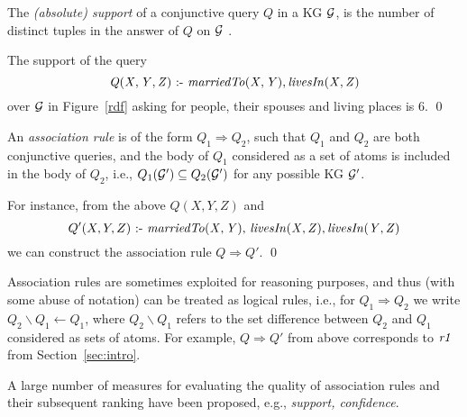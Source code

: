 The \emph{(absolute) support} of a conjunctive query $Q$ in a KG $\mathcal{G}$, is the number of distinct tuples in the answer of $Q$ on $\mathcal{G}$ \cite{DBLP:conf/ilp/DehaspeR97}. 

\begin{example}
The support of the query
\begin{equation}\mathit{Q(X,Y,Z)\text{ :- }marriedTo(X,Y),\, }\mathit{livesIn(X,Z)}
\end{equation}
over $\mathcal{G}$ in Figure~\ref{rdf} asking for people, their spouses and living places is $6$. \qed
\end{example} 

\begin{definition}
An \emph{association rule} is of the form $Q_1\Rightarrow Q_2$, such that $Q_1$ and $Q_2$ are both conjunctive queries, and the body of $Q_1$ considered as a set of atoms is included in the body of $Q_2$,  i.e., $Q_1(\mathcal{G}')\subseteq Q_2(\mathcal{G}')$ for any possible KG $\mathcal{G}'$. 
\end{definition}

\begin{example}
For instance, from the above $Q(X,Y,Z)$ and
\begin{equation}Q'(X,Y,Z)\text{ :- }\mathit{marriedTo(X,Y),\,livesIn(X,Z),\,} \mathit{livesIn(Y,Z)}
\end{equation} we can construct the association rule $Q \Rightarrow Q'$. \qed
 \end{example}

Association rules are sometimes exploited for reasoning purposes, and thus (with some abuse of notation) can be treated as logical rules, i.e., for $Q_1 \Rightarrow Q_2$ we write $Q_2\backslash Q_1 \leftarrow Q_1$, where $Q_2 \backslash Q_1$ refers to the set difference between $Q_2$ and $Q_1$ considered as sets of atoms. For example, $Q \Rightarrow Q'$ from above corresponds to $\mathit{r1}$ from Section~\ref{sec:intro}.

A large number of measures for evaluating the quality of association rules and their subsequent ranking have been proposed, e.g., \emph{support, confidence}. 


